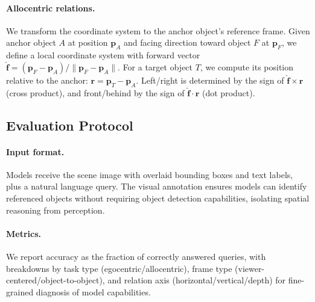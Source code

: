 \paragraph{Allocentric relations.} We transform the coordinate system to the anchor object's reference frame. Given anchor object $A$ at position $\mathbf{p}_A$ and facing direction toward object $F$ at $\mathbf{p}_F$, we define a local coordinate system with forward vector $\hat{\mathbf{f}} = (\mathbf{p}_F - \mathbf{p}_A) / \|\mathbf{p}_F - \mathbf{p}_A\|$. For a target object $T$, we compute its position relative to the anchor: $\mathbf{r} = \mathbf{p}_T - \mathbf{p}_A$. Left/right is determined by the sign of $\hat{\mathbf{f}} \times \mathbf{r}$ (cross product), and front/behind by the sign of $\hat{\mathbf{f}} \cdot \mathbf{r}$ (dot product).

\subsection{Evaluation Protocol}

\paragraph{Input format.} Models receive the scene image with overlaid bounding boxes and text labels, plus a natural language query. The visual annotation ensures models can identify referenced objects without requiring object detection capabilities, isolating spatial reasoning from perception.

\paragraph{Metrics.} We report accuracy as the fraction of correctly answered queries, with breakdowns by task type (egocentric/allocentric), frame type (viewer-centered/object-to-object), and relation axis (horizontal/vertical/depth) for fine-grained diagnosis of model capabilities.
